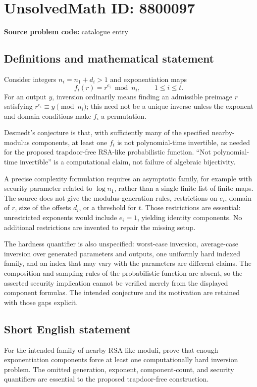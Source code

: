 \documentclass[11pt]{article}
\begin{document}
\section*{UnsolvedMath ID: 8800097}
\textbf{Source problem code:} catalogue entry
\subsection{Definitions and mathematical statement}
Consider integers \(n_i=n_1+d_i>1\) and exponentiation maps
\[
 f_i(r)=r^{e_i}\bmod n_i,\qquad1\leq i\leq t.
\]
For an output \(y\), inversion ordinarily means finding an admissible preimage \(r\) satisfying \(r^{e_i}\equiv y\pmod{n_i}\); this need not be a unique inverse unless the exponent and domain conditions make \(f_i\) a permutation.

Desmedt's conjecture is that, with sufficiently many of the specified nearby-modulus components, at least one \(f_i\) is not polynomial-time invertible, as needed for the proposed trapdoor-free RSA-like probabilistic function. ``Not polynomial-time invertible'' is a computational claim, not failure of algebraic bijectivity.

A precise complexity formulation requires an asymptotic family, for example with security parameter related to \(\log n_1\), rather than a single finite list of finite maps. The source does not give the modulus-generation rules, restrictions on \(e_i\), domain of \(r\), size of the offsets \(d_i\), or a threshold for \(t\). Those restrictions are essential: unrestricted exponents would include \(e_i=1\), yielding identity components. No additional restrictions are invented to repair the missing setup.

The hardness quantifier is also unspecified: worst-case inversion, average-case inversion over generated parameters and outputs, one uniformly hard indexed family, and an index that may vary with the parameters are different claims. The composition and sampling rules of the probabilistic function are absent, so the asserted security implication cannot be verified merely from the displayed component formulas. The intended conjecture and its motivation are retained with those gaps explicit.
\subsection{Short English statement}
For the intended family of nearby RSA-like moduli, prove that enough exponentiation components force at least one computationally hard inversion problem. The omitted generation, exponent, component-count, and security quantifiers are essential to the proposed trapdoor-free construction.
\end{document}
